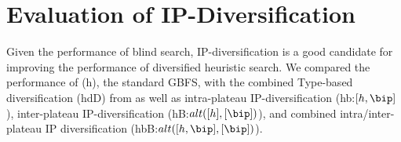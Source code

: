 \section{Evaluation of IP-Diversification} 



Given the performance of blind search,
IP-diversification is a good candidate for improving the performance of diversified heuristic search.
% 
% 
% 
We compared the performance of 
(h), the standard GBFS, with
the combined Type-based diversification (hdD) from 
as well as intra-plateau  IP-diversification (hb:$[h,\bip]$), inter-plateau IP-diversification (hB:$alt([h],[\bip])$), and combined intra/inter-plateau IP diversification (hbB:$alt([h,\bip],[\bip])$).

